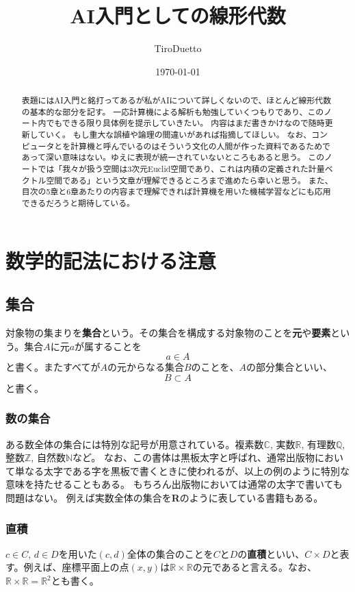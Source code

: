 \documentclass[10pt]{jsarticle}
\title{AI入門としての線形代数}
\author{TiroDuetto}
\date{\today}
\numberwithin{equation}{section}%
\begin{document}
\maketitle

\begin{abstract}
表題にはAI入門と銘打ってあるが私がAIについて詳しくないので、ほとんど線形代数の基本的な部分を記す。
一応計算機による解析も勉強していくつもりであり、このノート内でもできる限り具体例を提示していきたい。
内容はまだ書きかけなので随時更新していく。
もし重大な誤植や論理の間違いがあれば指摘してほしい。
なお、コンピュータとを計算機と呼んでいるのはそういう文化の人間が作った資料であるためであって深い意味はない。ゆえに表現が統一されていないところもあると思う。
このノートでは「我々が扱う空間は3次元Euclid空間であり、これは内積の定義された計量ベクトル空間である」という文章が理解できるところまで進めたら幸いと思う。
また、目次の5章と6章あたりの内容まで理解できれば計算機を用いた機械学習などにも応用できるだろうと期待している。
\end{abstract}
\tableofcontents
\setcounter{section}{-1}
\section{数学的記法における注意}
\subsection{集合}
対象物の集まりを{\bf 集合}という。その集合を構成する対象物のことを{\bf 元}や{\bf 要素}という。集合$A$に元$a$が属することを
\begin{equation}
  a \in A 
\end{equation}
と書く。またすべてが$A$の元からなる集合$B$のことを、$A$の部分集合といい、
\begin{equation}
  B \subset A
\end{equation}
と書く。
\subsubsection{数の集合}
ある数全体の集合には特別な記号が用意されている。複素数$\mathbb{C}$, 実数$\mathbb{R}$, 有理数$\mathbb{Q}$, 整数$\mathbb{Z}$, 自然数$\mathbb{N}$など。
なお、この書体は黒板太字と呼ばれ、通常出版物において単なる太字である字を黒板で書くときに使われるが、以上の例のように特別な意味を持たせることもある。
もちろん出版物においては通常の太字で書いても問題はない。
例えば実数全体の集合を{\bf R}のように表している書籍もある。
\subsubsection{直積}
$c \in C, \, d\in D$を用いた$(c,d)$全体の集合のことを$C$と$D$の{\bf 直積}といい、$C\times D$と表す。例えば、座標平面上の点$(x,y)$は$\mathbb{R}\times \mathbb{R}$の元であると言える。なお、$\mathbb{R}\times \mathbb{R}=\mathbb{R}^{2}$とも書く。
\end{document}
